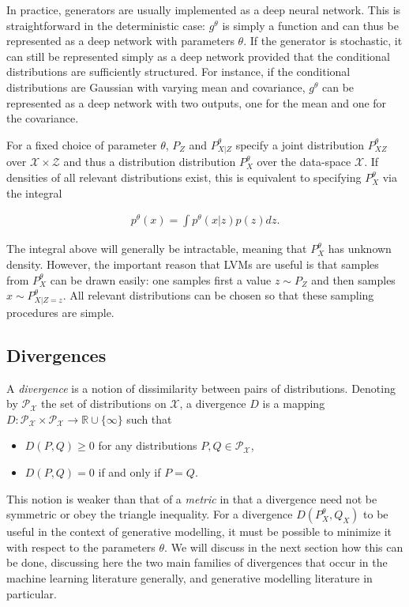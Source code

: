 In practice, generators are usually implemented as a deep neural network.
This is straightforward in the deterministic case: $g^\theta$ is simply a function and can thus be represented as a deep network with parameters $\theta$.
If the generator is stochastic, it can still be represented simply as a deep network provided that the conditional distributions are sufficiently structured. 
For instance, if the conditional distributions are Gaussian with varying mean and covariance, $g^\theta$ can be represented as a deep network with two outputs, one for the mean and one for the covariance.

For a fixed choice of parameter $\theta$, $P_Z$ and $P^\theta_{X|Z}$ specify a joint distribution $P^\theta_{XZ}$ over $\mathcal{X} \times \mathcal{Z}$ and thus a distribution distribution $P_X^\theta$ over the data-space $\mathcal{X}$. 
If densities of all relevant distributions exist, this is equivalent to specifying $P_X^\theta$ via the integral

\begin{align*}
p^\theta(x) = \int p^\theta(x|z) p(z) dz.
\end{align*}

The integral above will generally be intractable, meaning that $P_X^\theta$ has unknown density.
However, the important reason that LVMs are useful is that samples from $P_X^\theta$ can be drawn easily:
one samples first a value $z\sim P_Z$ and then samples $x \sim P^\theta_{X|Z=z}$. 
All relevant distributions can be chosen so that these sampling procedures are simple.


\subsection{Divergences}\label{subsec:gen-model-divergence}

A \emph{divergence} is a notion of dissimilarity between pairs of distributions. 
Denoting by $\mathcal{P}_{\mathcal{X}}$ the set of distributions on $\mathcal{X}$, a divergence $D$ is a mapping $D: \mathcal{P}_{\mathcal{X}} \times \mathcal{P}_{\mathcal{X}} \to \mathbb{R} \cup \{\infty\}$ such that

\begin{itemize}
\item $D(P, Q)  \geq 0$ for any distributions $P, Q \in \mathcal{P}_{\mathcal{X}}$,
\item $D(P, Q) = 0$ if and only if $P = Q$.
\end{itemize}

This notion is weaker than that of a \emph{metric} in that a divergence need not be symmetric or obey the triangle inequality.
For a divergence $D(P^\theta_X, Q_X)$ to be useful in the context of generative modelling, it must be possible to minimize it with respect to the parameters $\theta$. 
We will discuss in the next section how this can be done, discussing here the two main families 
of divergences that occur in the machine learning literature generally, and generative modelling literature in particular. 

